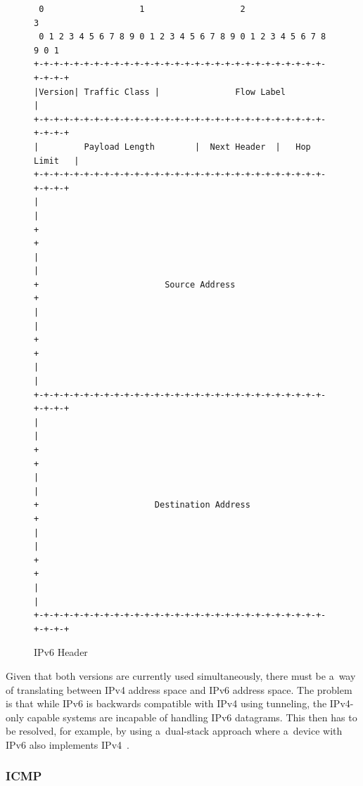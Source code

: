 \documentclass[
  printed,     %
  color,       %
  oneside,     %
  nosansbold,  %
  nocolorbold, %
  nolof,         %
  nolot,         %
]{fithesis4}
\begin{document}
\begin{figure}[h]
\fontsize{10pt}{10pt}\selectfont
\begin{center}
\begin{BVerbatim}
 0                   1                   2                   3  
 0 1 2 3 4 5 6 7 8 9 0 1 2 3 4 5 6 7 8 9 0 1 2 3 4 5 6 7 8 9 0 1
+-+-+-+-+-+-+-+-+-+-+-+-+-+-+-+-+-+-+-+-+-+-+-+-+-+-+-+-+-+-+-+-+
|Version| Traffic Class |               Flow Label              |
+-+-+-+-+-+-+-+-+-+-+-+-+-+-+-+-+-+-+-+-+-+-+-+-+-+-+-+-+-+-+-+-+
|         Payload Length        |  Next Header  |   Hop Limit   |
+-+-+-+-+-+-+-+-+-+-+-+-+-+-+-+-+-+-+-+-+-+-+-+-+-+-+-+-+-+-+-+-+
|                                                               |
+                                                               +
|                                                               |
+                         Source Address                        +
|                                                               |
+                                                               +
|                                                               |
+-+-+-+-+-+-+-+-+-+-+-+-+-+-+-+-+-+-+-+-+-+-+-+-+-+-+-+-+-+-+-+-+
|                                                               |
+                                                               +
|                                                               |
+                       Destination Address                     +
|                                                               |
+                                                               +
|                                                               |
+-+-+-+-+-+-+-+-+-+-+-+-+-+-+-+-+-+-+-+-+-+-+-+-+-+-+-+-+-+-+-+-+
\end{BVerbatim}
\end{center}
  \caption{IPv6 Header~\cite{RFC2460}}
  \label{fig:ipv6_header}
\end{figure}


\bigskip

Given that both versions are currently used simultaneously, there must be a~way of translating between IPv4 address space and IPv6 address space. The problem is that while IPv6 is backwards compatible with IPv4 using tunneling, the IPv4-only capable systems are incapable of handling IPv6 datagrams. This then has to be resolved, for example, by using a~dual-stack approach where a~device with IPv6 also implements IPv4~\cite{10.5555/2584507}.

\subsubsection{ICMP}
\end{document}
